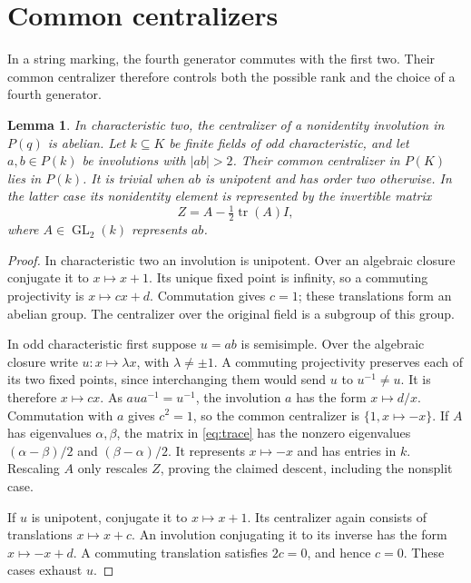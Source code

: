 \documentclass[11pt,a4paper]{article}
\newtheorem{lemma}[theorem]{Lemma}
\newcommand{\tr}{\operatorname{tr}}
\begin{document}
\section{Common centralizers}
In a string marking, the fourth generator commutes with the first two.
Their common centralizer therefore controls both the possible rank and
the choice of a fourth generator.
\begin{lemma}\label{lemma:centralizer}
In characteristic two, the centralizer of a nonidentity involution in
$P(q)$ is abelian. Let $k\subseteq K$ be finite fields of odd characteristic,
and let $a,b\in P(k)$ be involutions with $|ab|>2$. Their common centralizer
in $P(K)$ lies in $P(k)$. It is trivial when $ab$ is unipotent and has
order two otherwise. In the latter case its nonidentity element is represented
by the invertible matrix
\begin{equation}\label{eq:trace}
 Z=A-\tfrac12\tr(A)I,
\end{equation}
where $A\in\operatorname{GL}_2(k)$ represents $ab$.
\end{lemma}
\begin{proof}
In characteristic two an involution is unipotent. Over an algebraic closure
conjugate it to $x\mapsto x+1$. Its unique fixed point is infinity, so a
commuting projectivity is $x\mapsto cx+d$. Commutation gives $c=1$;
these translations form an abelian group. The centralizer over the original
field is a subgroup of this group.

In odd characteristic first suppose $u=ab$ is semisimple. Over the algebraic
closure write $u:x\mapsto\lambda x$, with $\lambda\ne\pm1$.
A commuting projectivity preserves each of its two fixed points, since
interchanging them would send $u$ to $u^{-1}\ne u$. It is therefore
$x\mapsto cx$. As $aua^{-1}=u^{-1}$, the involution $a$ has the form
$x\mapsto d/x$. Commutation with $a$ gives $c^2=1$, so the common
centralizer is $\{1,x\mapsto-x\}$. If $A$ has eigenvalues
$\alpha,\beta$, the matrix in \eqref{eq:trace} has the nonzero eigenvalues
$(\alpha-\beta)/2$ and $(\beta-\alpha)/2$. It represents $x\mapsto-x$
and has entries in $k$. Rescaling $A$ only rescales $Z$, proving the
claimed descent, including the nonsplit case.

If $u$ is unipotent, conjugate it to $x\mapsto x+1$. Its centralizer again
consists of translations $x\mapsto x+c$. An involution conjugating it to
its inverse has the form $x\mapsto-x+d$. A commuting translation satisfies
$2c=0$, and hence $c=0$. These cases exhaust $u$.
\end{proof}
\end{document}
